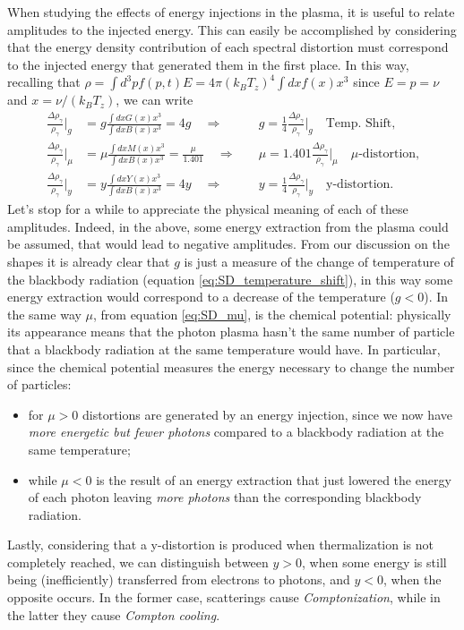 When studying the effects of energy injections in the plasma, it is useful to relate amplitudes to the injected energy. This can easily be accomplished by considering that the energy density contribution of each spectral distortion must correspond to the injected energy that generated them in the first place. In this way, recalling that $\rho=\int d^3pf(p,t)E=4\pi (k_BT_z)^4\int dxf(x)x^3$ since $E=p=\nu$ and $x=\nu/(k_BT_z)$, we can write
\begin{subequations}
    \begin{align}
    \label{eq:SD_g_amplitude}\frac{\Delta \rho_\gamma}{\rho_\gamma}\bigg|_g&=g\frac{\int dxG(x)x^3}{\int dx B(x)x^3}=4g\quad\Rightarrow\quad &\boxed{g=\frac{1}{4}\frac{\Delta \rho_\gamma}{\rho_\gamma}\bigg|_g}\quad \text{Temp. Shift,}\\\label{eq:SD_mu_amplitude}
    \frac{\Delta \rho_\gamma}{\rho_\gamma}\bigg|_\mu&=\mu\frac{\int dxM(x)x^3}{\int dx B(x)x^3}=\frac{\mu}{1.401}\quad\Rightarrow\quad &\boxed{\mu=1.401\frac{\Delta \rho_\gamma}{\rho_\gamma}\bigg|_\mu}\quad\mu\text{-distortion,}\\\label{eq:SD_y_amplitude}
    \frac{\Delta \rho_\gamma}{\rho_\gamma}\bigg|_y&=y\frac{\int dxY(x)x^3}{\int dx B(x)x^3}=4y\quad\Rightarrow\quad &\boxed{y=\frac{1}{4}\frac{\Delta \rho_\gamma}{\rho_\gamma}\bigg|_y}\quad\text{y-distortion.}
\end{align}
\end{subequations}
Let's stop for a while to appreciate the physical meaning of each of these amplitudes. Indeed, in the above, some energy extraction from the plasma could be assumed, that would lead to negative amplitudes. From our discussion on the shapes it is already clear that $g$ is just a measure of the change of temperature of the blackbody radiation (equation \eqref{eq:SD_temperature_shift}), in this way some energy extraction would correspond to a decrease of the temperature ($g<0$). In the same way  $\mu$, from equation \eqref{eq:SD_mu}, is the chemical potential: physically its appearance means that the photon plasma hasn't the same number of particle that a blackbody radiation at the same temperature would have. In particular, since the chemical potential measures the energy necessary to change the number of particles:
\begin{itemize}
    \item for $\mu>0$ distortions are generated by an energy injection, since we now have \emph{more energetic but fewer photons} compared to a blackbody radiation at the same temperature;
    \item while $\mu<0$ is the result of an energy extraction that just lowered the energy of each photon leaving \emph{more photons} than the corresponding blackbody radiation.
\end{itemize}
Lastly, considering that a y-distortion is produced when thermalization is not completely reached, we can distinguish between $y>0$, when some energy is still being (inefficiently) transferred from electrons to photons, and $y<0$, when the opposite occurs. In the former case, scatterings cause \emph{Comptonization}, while in the latter they cause \emph{Compton cooling}. 

